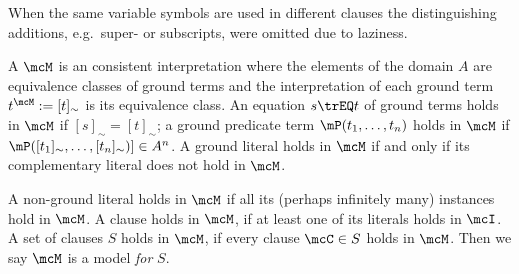 %
\begin{remark}
When the same variable symbols are used in different clauses the distinguishing additions, e.g.~super- or subscripts, were omitted due to laziness.
\end{remark}
%
%
\begin{definition}\label{def:model}
A  \( \mcM \) is an consistent interpretation where the elements of the domain \( A \)
are equivalence classes of ground terms
and the interpretation of each ground term \( t^\mcM := [t]_\sim \) is its equivalence class.
An equation \( s\trEQ t \) of ground terms holds in \( \mcM \) if \( [s]_\sim=[t]_\sim \);
a ground predicate term \( \mP(t_1,\ldots,t_n) \) holds in \( \mcM \) if \( \mP([t_1]_\sim,\ldots,[t_n]_\sim)] \in A^n \).
A ground literal holds in \( \mcM \) if and only if its complementary literal does not hold in \( \mcM \).

A non-ground literal holds in \( \mcM \) if all its
(perhaps infinitely many)
instances hold in \( \mcM \).
A clause holds in \( \mcM \), if at least one of its literals holds in \( \mcI \).
A set of clauses \( S \) holds in \( \mcM \), if every clause \( \mcC\in S \) holds in \( \mcM \).
Then we say \( \mcM \) is a model {\em for} \( S \).

\end{definition}
%
%


